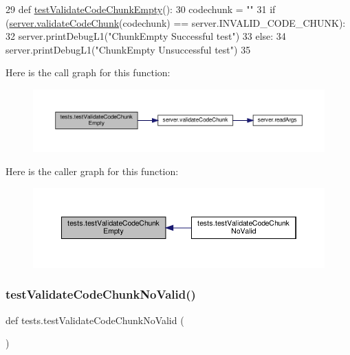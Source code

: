 \begin{DoxyCode}
29 \textcolor{keyword}{def }\hyperlink{namespacetests_a257095677e195c3499fa13fb7eb08a3e}{testValidateCodeChunkEmpty}():
30      codechunk = \textcolor{stringliteral}{""}
31      \textcolor{keywordflow}{if} (\hyperlink{namespaceserver_ad6f5a9a8c8e233d0537dc69dc6de98f6}{server.validateCodeChunk}(codechunk) == server.INVALID\_CODE\_CHUNK):
32           server.printDebugL1(\textcolor{stringliteral}{"ChunkEmpty Successful test"})
33      \textcolor{keywordflow}{else}:
34           server.printDebugL1(\textcolor{stringliteral}{"ChunkEmpty Unsuccessful test"})
35 
\end{DoxyCode}
Here is the call graph for this function\+:
\nopagebreak
\begin{figure}[H]
\begin{center}
\leavevmode
\includegraphics[width=350pt]{namespacetests_a257095677e195c3499fa13fb7eb08a3e_cgraph}
\end{center}
\end{figure}
Here is the caller graph for this function\+:
\nopagebreak
\begin{figure}[H]
\begin{center}
\leavevmode
\includegraphics[width=350pt]{namespacetests_a257095677e195c3499fa13fb7eb08a3e_icgraph}
\end{center}
\end{figure}
\mbox{\label{namespacetests_a625a9a5cd2f728455da250e9ba37d457}} 
\subsubsection{\texorpdfstring{test\+Validate\+Code\+Chunk\+No\+Valid()}{testValidateCodeChunkNoValid()}}
{\footnotesize\ttfamily def tests.\+test\+Validate\+Code\+Chunk\+No\+Valid (\begin{DoxyParamCaption}{ }\end{DoxyParamCaption})}


